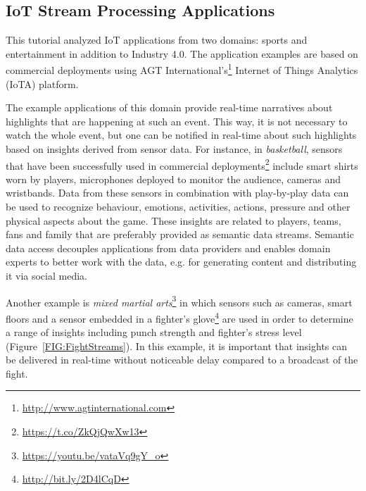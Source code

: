 \subsection{IoT Stream Processing Applications}
This tutorial analyzed IoT applications from two domains: sports and entertainment in addition to Industry 4.0. The application examples are based on commercial deployments using AGT International's\footnote{\url{http://www.agtinternational.com}} Internet of Things Analytics (IoTA) platform.

The example applications of this domain provide real-time narratives about highlights that are happening at such an event. This way, it is not necessary to watch the whole event, but one can be notified in real-time about such highlights based on insights derived from sensor data. For instance, in \emph{basketball}, sensors that have been successfully used in commercial deployments\footnote{\url{https://t.co/ZkQjQwXw13}} include smart shirts worn by players, microphones deployed to monitor the audience,  cameras and wristbands. Data from these sensors in combination with play-by-play data can be used to recognize behaviour, emotions, activities, actions, pressure and other physical aspects about the game. These insights are related to players, teams, fans and family that are preferably provided as semantic data streams. Semantic data access decouples applications from data providers and enables domain experts to better work with the data, e.g. for generating content and distributing it via social media.

Another example is \emph{mixed martial arts}\footnote{\url{https://youtu.be/vataVq9gY_o}} in which sensors such as cameras, smart floors and a sensor embedded in a fighter's glove\footnote{\url{http://bit.ly/2D4lCqD}} are used in order to determine a range of insights including punch strength and fighter's stress level (Figure~\ref{FIG:FightStreams}). In this example, it is important that insights can be delivered in real-time without noticeable delay compared to a broadcast of the fight.

